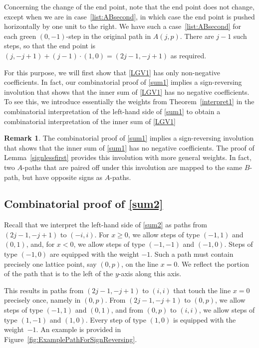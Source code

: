 \documentclass[12pt]{amsart}
\theoremstyle{definition}
\newtheorem{remark}[theorem]{Remark}
\numberwithin{equation}{section}
\begin{document}
Concerning the change of the end point, note that the end point does not change, except when we are in case~\eqref{list:ABsecond}, in which case the end point is pushed horizontally by one unit to the right. We have such a case~\eqref{list:ABsecond} for each green $(0,-1)$-step in the original path in $A(j,p)$. There are $j-1$ such steps, so that the end point is 
$(j,-j+1)+(j-1) \cdot (1,0)=(2j-1,-j+1)$ as required.

For this purpose, we will first show that \eqref{LGV1} has only non-negative coefficients. In fact, our combinatorial proof 
of \eqref{sum1} implies  a sign-reversing involution that shows that the inner sum of \eqref{LGV1} has no negative coefficients. To see this, we introduce essentially the weights from Theorem~\ref{interpret1} in the combinatorial interpretation of the left-hand side of \eqref{sum1} to obtain 
a combinatorial interpretation of the inner sum of \eqref{LGV1} 

\begin{remark}
	The combinatorial proof of \eqref{sum1} implies a sign-reversing involution that shows that the inner sum of \eqref{sum1} has no negative coefficients. The proof of Lemma~\ref{signlessfirst} provides this involution with more general weights. In fact, two $A$-paths that are paired off under this involution are mapped to the same $B$-path, but have opposite signs as $A$-paths. 
\end{remark}

\subsection{\texorpdfstring{Combinatorial proof of \eqref{sum2}}{Combinatorial proof of (6.2)}}
\label{outersection}

Recall that we interpret the left-hand side of \eqref{sum2} as paths from $(2j-1,-j+1)$ to $(-i,i)$. For $x \ge 0$, 
we allow steps of type $(-1,1)$ and $(0,1)$, and, for $x < 0$, we allow steps of type $(-1,-1)$ and $(-1,0)$. Steps of type $(-1,0)$ are equipped with the weight $-1$. Such a path must contain precisely one lattice point, say $(0,p)$, 
on the line $x=0$. We reflect the portion of the path that is to the left of the $y$-axis along this axis. 

This results in paths from $(2j-1,-j+1)$ to $(i,i)$ that touch the line $x=0$ precisely once, namely in $(0,p)$. 
From  $(2j-1,-j+1)$ to $(0,p)$, we allow steps of type $(-1,1)$ and $(0,1)$, and from $(0,p)$ to $(i,i)$, we allow steps of type $(1,-1)$ and $(1,0)$. Every step of type $(1,0)$ is equipped with the weight~$-1$. An example is provided in Figure~\ref{fig:ExamplePathForSignReversing}.
\end{document}
